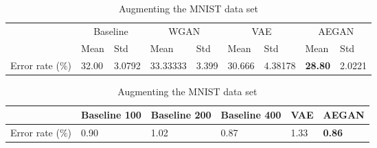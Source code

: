 \begin{table}[t]
    \centering
    \caption{Toy experiments on data augmentation}
    \label{tab:toy_experiments}
    \begin{subtable}{0.9\textwidth}
        \begin{tabular}{|l|ll|ll|ll|ll|}
            \cline{2-9}
            \multicolumn{1}{c|}{ } & \multicolumn{2}{c|}{Baseline} & \multicolumn{2}{c|}{WGAN} & \multicolumn{2}{c|}{VAE} & \multicolumn{2}{c|}{AEGAN} \\ \cline{2-9}
            \multicolumn{1}{c|}{} & Mean & Std & Mean & Std & Mean & Std & Mean & Std \\ \hline
            Error rate ($\%$) & \num{32.00} & \num{3.0792} & \num{33.33333} & \num{3.399} & \num{30.666} & \num{4.38178} & \textbf{\num{28.80}} & \num{2.0221} \\
            \hline
        \end{tabular}
        \caption{Augmenting the iris data set}
    \end{subtable}
    \begin{subtable}{0.9\textwidth}
        \begin{tabular}{|l|lll|l|l|}
            \cline{2-6}
            \multicolumn{1}{c|}{} & Baseline 100 & Baseline 200 & Baseline 400 & VAE & AEGAN \\ \hline
            Error rate ($\%$) & \num{0.90} & \num{1.02} & \num{0.87} & \num{1.33} & \textbf{\num{0.86}} \\ \hline
        \end{tabular}
        \caption{Augmenting the MNIST data set}
    \end{subtable}
\end{table}


